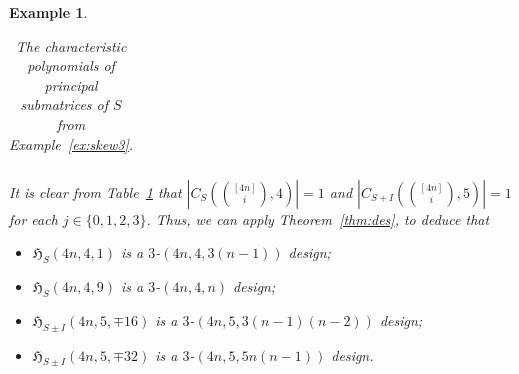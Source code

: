 \documentclass[11pt]{article}
\newtheorem{example}[theorem]{Example}
\begin{document}
\begin{example}
\begin{table}[H]
\begin{tabular}{c|c}
    \end{tabular}
    \caption{The characteristic polynomials of principal submatrices of $S$ from Example~\ref{ex:skew3}.}
    \label{tab:charSkew3}
\end{table}
It is clear from Table~\ref{tab:charSkew3} that $\left |C_S\left (\binom{[4n]}{i},4 \right )\right | = 1$ and $\left |C_{S+I}\left (\binom{[4n]}{i},5\right )\right | = 1$ for each $j \in \{0,1,2,3\}$.
Thus, we can apply Theorem~\ref{thm:des}, to deduce that 
\begin{itemize}
    \item $\mathfrak H_{S}(4n,4,1)$ is a $3$-$(4n,4,3(n-1))$ design;
    \item $\mathfrak H_{S}(4n,4,9)$ is a $3$-$(4n,4,n)$ design;
    \item $\mathfrak H_{S\pm I}(4n,5,\mp 16)$ is a $3$-$(4n,5,3(n-1)(n-2))$ design;
    \item  $\mathfrak H_{S\pm I}(4n,5,\mp 32)$ is a $3$-$(4n,5,5n(n-1))$ design.
\end{itemize}

\end{example}
\end{document}
